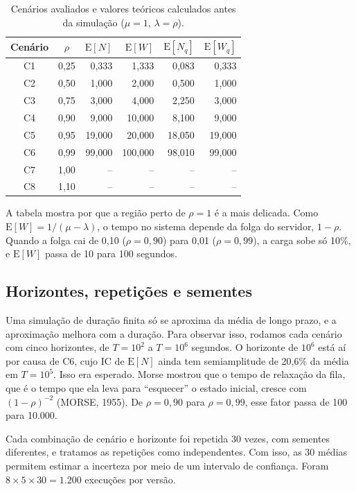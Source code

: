 \documentclass[
  article,      %
  10pt,         %
  oneside,
  a4paper,
  twocolumn,    %
  english,
  brazil        %
]{abntex2}
\newcommand{\EN}{\mathrm{E}[N]}
\newcommand{\EW}{\mathrm{E}[W]}
\newcommand{\ENq}{\mathrm{E}[N_q]}
\newcommand{\EWq}{\mathrm{E}[W_q]}
\begin{document}
\begin{table}[htbp]
  \centering
  \caption{Cenários avaliados e valores teóricos calculados antes da simulação ($\mu=1$, $\lambda=\rho$).}
  \label{tab:cenarios}
  \small
  \setlength{\tabcolsep}{4pt}
  \begin{tabular}{ccrrrr}
    \toprule
    Cenário & $\rho$ & $\EN$ & $\EW$ & $\ENq$ & $\EWq$ \\
    \midrule
    C1 & 0,25 & 0,333 & 1,333 & 0,083 & 0,333 \\
    C2 & 0,50 & 1,000 & 2,000 & 0,500 & 1,000 \\
    C3 & 0,75 & 3,000 & 4,000 & 2,250 & 3,000 \\
    C4 & 0,90 & 9,000 & 10,000 & 8,100 & 9,000 \\
    C5 & 0,95 & 19,000 & 20,000 & 18,050 & 19,000 \\
    C6 & 0,99 & 99,000 & 100,000 & 98,010 & 99,000 \\
    C7 & 1,00 & -- & -- & -- & -- \\
    C8 & 1,10 & -- & -- & -- & -- \\
    \bottomrule
  \end{tabular}
\end{table}

A tabela mostra por que a região perto de $\rho=1$ é a mais delicada. Como $\EW=1/(\mu-\lambda)$, o tempo no sistema depende da folga do servidor, $1-\rho$. Quando a folga cai de 0,10 ($\rho=0{,}90$) para 0,01 ($\rho=0{,}99$), a carga sobe só 10\%, e $\EW$ passa de 10 para 100 segundos.

\subsection{Horizontes, repetições e sementes}

Uma simulação de duração finita só se aproxima da média de longo prazo, e a aproximação melhora com a duração. Para observar isso, rodamos cada cenário com cinco horizontes, de $T=10^2$ a $T=10^6$ segundos. O horizonte de $10^6$ está aí por causa de C6, cujo IC de $\EN$ ainda tem semiamplitude de 20,6\% da média em $T=10^5$. Isso era esperado. Morse mostrou que o tempo de relaxação da fila, que é o tempo que ela leva para ``esquecer'' o estado inicial, cresce com $(1-\rho)^{-2}$ (MORSE, 1955). De $\rho=0{,}90$ para $\rho=0{,}99$, esse fator passa de 100 para 10.000.

Cada combinação de cenário e horizonte foi repetida 30 vezes, com sementes diferentes, e tratamos as repetições como independentes. Com isso, as 30 médias permitem estimar a incerteza por meio de um intervalo de confiança. Foram $8\times5\times30=1.200$ execuções por versão.
\end{document}
